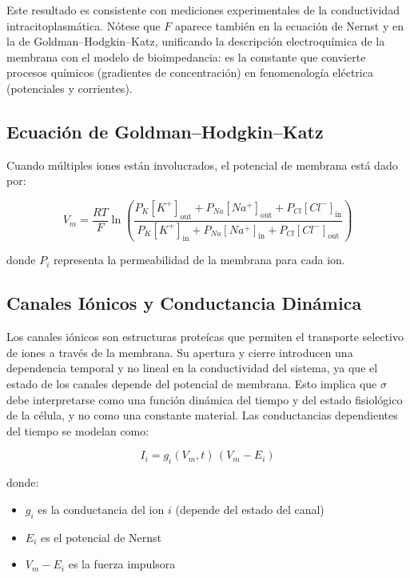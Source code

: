 \documentclass[12pt]{article}
\begin{document}
Este resultado es consistente con mediciones experimentales de la conductividad
intracitoplasm\'atica. N\'otese que $F$ aparece tambi\'en en la ecuaci\'on de
Nernst y en la de Goldman--Hodgkin--Katz, unificando la descripci\'on
electroqu\'imica de la membrana con el modelo de bioimpedancia: es la constante
que convierte procesos qu\'imicos (gradientes de concentraci\'on) en
fenomenolog\'ia el\'ectrica (potenciales y corrientes).

\subsection{Ecuaci\'on de Goldman--Hodgkin--Katz}

Cuando m\'ultiples iones est\'an involucrados, el potencial de membrana est\'a dado por:

\begin{equation}
V_m =
\frac{RT}{F}
\ln\left(
\frac{
P_K[K^+]_{\text{out}} + P_{Na}[Na^+]_{\text{out}} + P_{Cl}[Cl^-]_{\text{in}}
}{
P_K[K^+]_{\text{in}} + P_{Na}[Na^+]_{\text{in}} + P_{Cl}[Cl^-]_{\text{out}}
}
\right)
\end{equation}

donde $P_i$ representa la permeabilidad de la membrana para cada ion.

\subsection{Canales I\'onicos y Conductancia Din\'amica}

Los canales i\'onicos son estructuras prote\'icas que permiten el transporte selectivo
de iones a trav\'es de la membrana. Su apertura y cierre introducen una dependencia
temporal y no lineal en la conductividad del sistema, ya que el estado de los canales
depende del potencial de membrana. Esto implica que $\sigma$ debe interpretarse como
una funci\'on din\'amica del tiempo y del estado fisiol\'ogico de la c\'elula, y no
como una constante material. Las conductancias dependientes del tiempo se modelan como:

\begin{equation}
I_i = g_i(V_m, t)\,(V_m - E_i)
\end{equation}

donde:

\begin{itemize}
\item $g_i$ es la conductancia del ion $i$ (depende del estado del canal)
\item $E_i$ es el potencial de Nernst
\item $V_m - E_i$ es la fuerza impulsora
\end{itemize}
\end{document}
